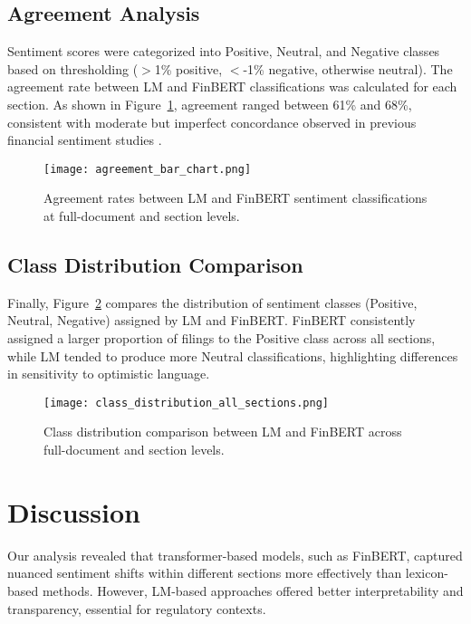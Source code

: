 \documentclass[12pt]{article}
\begin{document}
\subsection{Agreement Analysis}

Sentiment scores were categorized into Positive, Neutral, and Negative classes based on thresholding ($>$1\% positive, $<$-1\% negative, otherwise neutral). The agreement rate between LM and FinBERT classifications was calculated for each section. As shown in Figure~\ref{fig:agreement_bar}, agreement ranged between 61\% and 68\%, consistent with moderate but imperfect concordance observed in previous financial sentiment studies \citep{Li2010}.

\begin{figure}[H]
\centering
\texttt{[image: agreement\_bar\_chart.png]}
\caption{Agreement rates between LM and FinBERT sentiment classifications at full-document and section levels.}
\label{fig:agreement_bar}
\end{figure}
\vspace{0.5cm}

\subsection{Class Distribution Comparison}

Finally, Figure~\ref{fig:class_dist_all} compares the distribution of sentiment classes (Positive, Neutral, Negative) assigned by LM and FinBERT. FinBERT consistently assigned a larger proportion of filings to the Positive class across all sections, while LM tended to produce more Neutral classifications, highlighting differences in sensitivity to optimistic language.

\begin{figure}[H]
\centering
\texttt{[image: class\_distribution\_all\_sections.png]}
\caption{Class distribution comparison between LM and FinBERT across full-document and section levels.}
\label{fig:class_dist_all}
\end{figure}
\vspace{0.5cm}

\section{Discussion}
Our analysis revealed that transformer-based models, such as FinBERT, captured nuanced sentiment shifts within different sections more effectively than lexicon-based methods. However, LM-based approaches offered better interpretability and transparency, essential for regulatory contexts.
\end{document}
